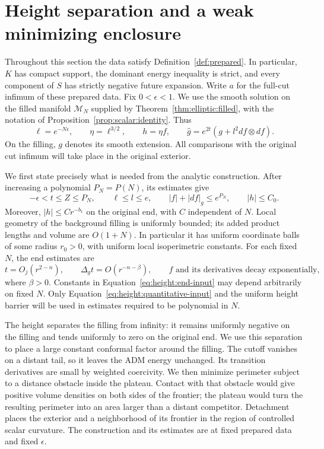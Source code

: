 \section{Height separation and a weak minimizing enclosure}
\label{sec:height}

Throughout this section the data satisfy Definition~\ref{def:prepared}.  In particular, $K$ has compact
support, the dominant energy inequality is strict, and every component of
$S$ has strictly negative future expansion.  Write $a$ for the full-cut
infimum of these prepared data.  Fix $0<\epsilon<1$.  We use the smooth
solution on the filled manifold $\mathcal M_N$ supplied by
Theorem~\ref{thm:elliptic:filled}, with the notation of
Proposition~\ref{prop:scalar:identity}.  Thus
\begin{equation}\label{eq:height:parameters}
 \ell=e^{-N\epsilon},\qquad \eta=\ell^{3/2},\qquad h=\eta f,
 \qquad \widehat g=e^{2t}(g+l^2df\otimes df).
\end{equation}
On the filling, $g$ denotes its smooth extension.  All comparisons with
the original cut infimum will take place in the original exterior.

We first state precisely what is needed from the analytic construction.
After increasing a polynomial $P_N=P(N)$, its estimates give
\begin{equation}\label{eq:height:quantitative-input}
 -\epsilon<t\le Z\le P_N,\qquad
 \ell\le l\le e,\qquad
 |f|+|df|_g\le e^{P_N},\qquad |h|\le C_0.
\end{equation}
Moreover, $|h|\le Cr^{-b_1}$ on the original end, with $C$ independent
of $N$.  Local geometry of the background filling is uniformly bounded;
its added product lengths and volume are $O(1+N)$.  In particular it has
uniform coordinate balls of some radius $r_0>0$, with uniform local
isoperimetric constants.  For each fixed $N$, the end estimates are
\begin{equation}\label{eq:height:end-input}
 t=O_j(r^{2-n}),\qquad \Delta_g t=O(r^{-n-\beta}),
 \qquad f\text{ and its derivatives decay exponentially},
\end{equation}
where $\beta>0$.  Constants in Equation~\eqref{eq:height:end-input}
may depend arbitrarily on fixed $N$.  Only
Equation~\eqref{eq:height:quantitative-input} and the uniform height
barrier will be used in estimates required to be polynomial in $N$.

The height separates the filling from infinity: it remains uniformly
negative on the filling and tends uniformly to zero on the original
end. We use this separation to place a large constant conformal
factor around the filling. The cutoff vanishes on a distant tail,
so it leaves the ADM energy unchanged. Its transition derivatives
are small by weighted coercivity. We then minimize perimeter subject
to a distance obstacle inside the plateau. Contact with that obstacle
would give positive volume densities on both sides of the frontier;
the plateau would turn the resulting perimeter into an area larger
than a distant competitor. Detachment places the exterior and a
neighborhood of its frontier in the region of controlled scalar
curvature. The construction and its estimates are at fixed prepared
data and fixed $\epsilon$.

